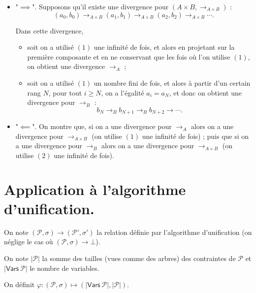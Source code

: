\documentclass[../main]{subfiles}
\begin{document}
  \begin{prv}
    \begin{itemize}
      \item "$\implies$".
        Supposons qu'il existe une divergence pour $(A \times B, \to_{A \times B})$ :
        \[
          (a_0, b_0) \to_{A \times B} (a_1, b_1) \to_{A \times B} (a_2, b_2) \to_{A \times B} \cdots
        .\] 

        Dans cette divergence,
        \begin{itemize}
          \item soit on a utilisé $(1)$ une infinité de fois, et alors en projetant sur la première composante et en ne conservant que les fois où l'on utilise $(1)$, on obtient une divergence  $\to_A$ ;
          \item soit on a utilisé $(1)$ un nombre fini de fois, et alors à partir d'un certain rang $N$, pour tout $i \ge N$, on a l'égalité $a_i = a_N$, et donc on obtient une divergence pour $\to_B$ : \[
          b_N \to_B b_{N+1} \to_B b_{N+2} \to \cdots 
          .\]
        \end{itemize}
      \item "$\impliedby$".
        On montre que, si on a une divergence pour $\to_A$ alors on a une divergence pour $\to_{A \times B}$ (on utilise $(1)$ une infinité de fois) ; puis que si on a une divergence pour $\to_B$ alors on a une divergence pour $\to_{A \times B}$ (on utilise $(2)$ une infinité de fois).
    \end{itemize}
  \end{prv}

  \section{Application à l'algorithme d'unification.}

  On note $(\mathcal{P}, \sigma) \to (\mathcal{P}', \sigma')$ la relation définie par l'algorithme d'unification (on néglige le cas où $(\mathcal{P}, \sigma) \to \bot$).

  On note $|\mathcal{P}|$ la somme des tailles (vues comme des arbres) des contraintes de $\mathcal{P}$ et $|\mathsf{Vars}\ \mathcal{P}|$ le nombre de variables.

  On définit $\varphi : (\mathcal{P}, \sigma) \mapsto (|\mathsf{Vars}\ \mathcal{P}|, |\mathcal{P}|)$.
\end{document}
